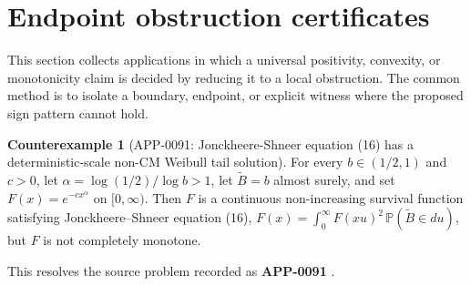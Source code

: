\documentclass[11pt]{article}
\numberwithin{equation}{section}
\theoremstyle{definition}
\newtheorem{counterexample}[theorem]{Counterexample}
\theoremstyle{remark}
\newcommand{\1}{\mathbf 1}
\begin{document}
\section{Endpoint obstruction certificates}
\label{sec:endpoint-obstruction-certificates}
This section collects applications in which a universal positivity, convexity, or monotonicity claim is decided by reducing it to a local obstruction.  The common method is to isolate a boundary, endpoint, or explicit witness where the proposed sign pattern cannot hold.

\begin{counterexample}[APP-0091: Jonckheere-Shneer equation (16) has a deterministic-scale non-CM Weibull tail solution]
\label{res:equation16-deterministicscale-weibull-noncm-solution}
For every \(b\in(1/2,1)\) and \(c>0\), let \(\alpha=\log(1/2)/\log b>1\), let \(\widetilde B=b\) almost surely, and set \(F(x)=e^{-cx^\alpha}\) on \([0,\infty)\). Then \(F\) is a continuous non-increasing survival function satisfying Jonckheere--Shneer equation (16), \(F(x)=\int_0^\infty F(xu)^2\,\mathbb P(\widetilde B\in du)\), but \(F\) is not completely monotone.



This resolves the source problem recorded as \textbf{APP-0091} \cite{app-app-0091-source}.
\end{counterexample}
\end{document}
